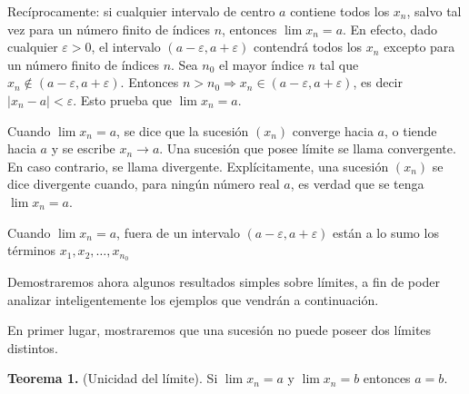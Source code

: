 \documentclass[12pt,oneside]{book}
\begin{document}
Recíprocamente: si cualquier intervalo de centro \(a\) contiene todos los \(x_n\), salvo tal vez para un número finito de índices \(n\), entonces \(\lim x_n = a\). En efecto, dado cualquier \(\varepsilon > 0\), el intervalo \((a - \varepsilon, a + \varepsilon)\) contendrá todos los \(x_n\) excepto para un número finito de índices \(n\). Sea \(n_0\) el mayor índice \(n\) tal que \(x_n \notin (a - \varepsilon, a + \varepsilon)\). Entonces \(n > n_0 \Rightarrow x_n \in (a - \varepsilon, a + \varepsilon)\), es decir \(|x_n - a| < \varepsilon\). Esto prueba que \(\lim x_n = a\).

Cuando \(\lim x_n = a\), se dice que la sucesión \((x_n)\) converge hacia \(a\), o tiende hacia \(a\) y se escribe \(x_n \to a\). Una sucesión que posee límite se llama convergente. En caso contrario, se llama divergente. Explícitamente, una sucesión \((x_n)\) se dice divergente cuando, para ningún número real \(a\), es verdad que se tenga \(\lim x_n = a\).

\begin{center}
\end{center}

Cuando \(\lim x_n = a\), fuera de un intervalo \((a - \varepsilon, a + \varepsilon)\) están a lo sumo los términos \(x_1, x_2, \dots, x_{n_0}\)

Demostraremos ahora algunos resultados simples sobre límites, a fin de poder analizar inteligentemente los ejemplos que vendrán a continuación.

En primer lugar, mostraremos que una sucesión no puede poseer dos límites distintos.

\textbf{Teorema 1.} (Unicidad del límite). Si \(\lim x_n = a\) y \(\lim x_n = b\) entonces \(a = b\).
\end{document}

